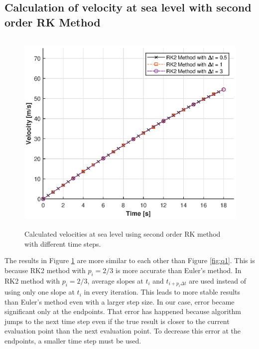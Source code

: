 \documentclass[letterpaper,12pt]{article}
\begin{document}
\subsection{Calculation of velocity at sea level with second order RK Method }
\begin{figure}[ht]
        \centering \includegraphics[max height=10cm]{graphs/RK2.eps}
        \caption{Calculated velocities at sea level using second order RK method with different time steps.}
        \label{fig:rk2}
\end{figure}
The results in Figure \ref{fig:rk2} are more similar to each other than Figure \ref{fig:q1}. This is because RK2 method with $p_i=2/3$
is more accurate than Euler's method. In RK2 method with $p_i=2/3$, average slopes at $t_i$ and $t_{i+p_i\Delta t}$
are used instead of using only one slope at $ t_i $ in every iteration. This leads to more stable results than Euler's method 
even with a larger step size. In our case, error became significant only at the endpoints. That error has happened because
algorithm jumps to the next time step even if the true result is closer to the current evaluation point than the next evaluation point.
To decrease this error at the endpoints, a smaller time step must be used.
\newpage
\end{document}
